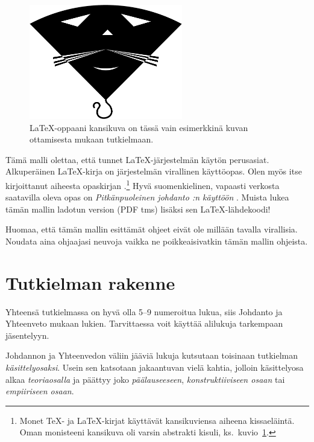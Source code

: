 \documentclass[utf8]{gradu3}
\begin{document}
\begin{figure}[h]\centering
  \includegraphics[height=5cm,keepaspectratio]{opus-kissa}
  \caption[\LaTeX-oppaani \parencite{kaijanaho03:_latex_ams_latex}
  kansikuva]{\LaTeX-oppaani \parencite{kaijanaho03:_latex_ams_latex}
    kansikuva on tässä vain esimerkkinä kuvan ottamisesta mukaan
    tutkielmaan.}
  \label{fig:opus-kissa}
\end{figure}

Tämä malli olettaa, että tunnet \LaTeX-järjestelmän käytön perusasiat.
Alkuperäinen \LaTeX-kirja \parencite{lamport94:_latex} on järjestelmän
virallinen käyttöopas.  Olen myös itse kirjoittanut aiheesta
opaskirjan \parencite{kaijanaho03:_latex_ams_latex}.\footnote{Monet
  \TeX- ja \LaTeX-kirjat käyttävät kansikuviensa aiheena kissaeläintä.
  Oman monisteeni kansikuva oli varsin abstrakti kisuli,
  ks.~kuvio~\ref{fig:opus-kissa}.}  Hyvä suomenkielinen, vapaasti
verkosta saatavilla oleva opas on \textit{Pitkänpuoleinen johdanto
  \LaTeXe:n käyttöön} \parencite{oetiker:_pitka_latex}.  Muista lukea
tämän mallin ladotun version (PDF tms) lisäksi sen \LaTeX-lähdekoodi!

Huomaa, että tämän mallin esittämät ohjeet eivät ole millään tavalla
virallisia.  Noudata aina ohjaajasi neuvoja vaikka ne poikkeaisivatkin
tämän mallin ohjeista.

\chapter{Tutkielman rakenne}

Yhteensä tutkielmassa on hyvä olla 5--9 numeroitua
lukua, siis Johdanto ja Yhteenveto mukaan lukien.  Tarvittaessa voit
käyttää alilukuja tarkempaan jäsentelyyn.

Johdannon ja Yhteenvedon väliin jääviä lukuja kutsutaan toisinaan
tutkielman \textit{käsittelyosaksi}.  Usein sen katsotaan jakaantuvan
vielä kahtia, jolloin käsittelyosa alkaa \textit{teoriaosalla} ja
päättyy joko \textit{päälauseeseen}, \textit{konstruktiiviseen osaan}
tai \textit{empiiriseen osaan}.
\end{document}
